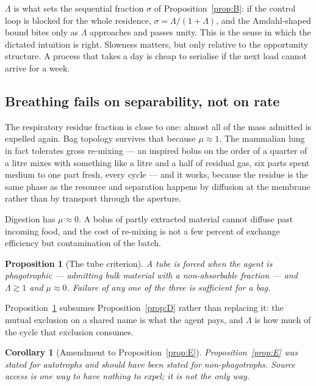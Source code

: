 \documentclass[11pt]{article}
\theoremstyle{plain}
\newtheorem{proposition}[theorem]{Proposition}
\newtheorem{corollary}[theorem]{Corollary}
\theoremstyle{definition}
\begin{document}
$\Lambda$ is what sets the sequential fraction $\sigma$ of Proposition~\ref{prop:B}: if the control
loop is blocked for the whole residence, $\sigma = \Lambda / (1 + \Lambda)$, and the Amdahl-shaped
bound bites only as $\Lambda$ approaches and passes unity. This is the sense in which the dictated
intuition is right. Slowness matters, but only relative to the opportunity structure. A process that
takes a day is cheap to serialise if the next load cannot arrive for a week.

\subsection{Breathing fails on separability, not on rate}

The respiratory residue fraction is close to one: almost all of the mass admitted is expelled again.
Bag topology survives that because $\mu \approx 1$. The mammalian lung in fact tolerates gross
re-mixing --- an inspired bolus on the order of a quarter of a litre mixes with something like a litre
and a half of residual gas, six parts spent medium to one part fresh, every cycle
\cite{farmer2015} --- and it works, because the residue is the same phase as the resource and
separation happens by diffusion at the membrane rather than by transport through the aperture.

Digestion has $\mu \approx 0$. A bolus of partly extracted material cannot diffuse past incoming food,
and the cost of re-mixing is not a few percent of exchange efficiency but contamination of the batch.

\begin{proposition}[The tube criterion]
\label{prop:I}
A tube is forced when the agent is \emph{phagotrophic} --- admitting bulk material with a
non-absorbable fraction --- and $\Lambda \gtrsim 1$ and $\mu \approx 0$. Failure of any one of the
three is sufficient for a bag.
\end{proposition}

Proposition~\ref{prop:I} subsumes Proposition~\ref{prop:D} rather than replacing it: the mutual
exclusion on a shared name is what the agent pays, and $\Lambda$ is how much of the cycle that
exclusion consumes.

\begin{corollary}[Amendment to Proposition~\ref{prop:E}]
\label{cor:E2}
Proposition~\ref{prop:E} was stated for autotrophs and should have been stated for non-phagotrophs.
Source access is one way to have nothing to expel; it is not the only way.
\end{corollary}
\end{document}
